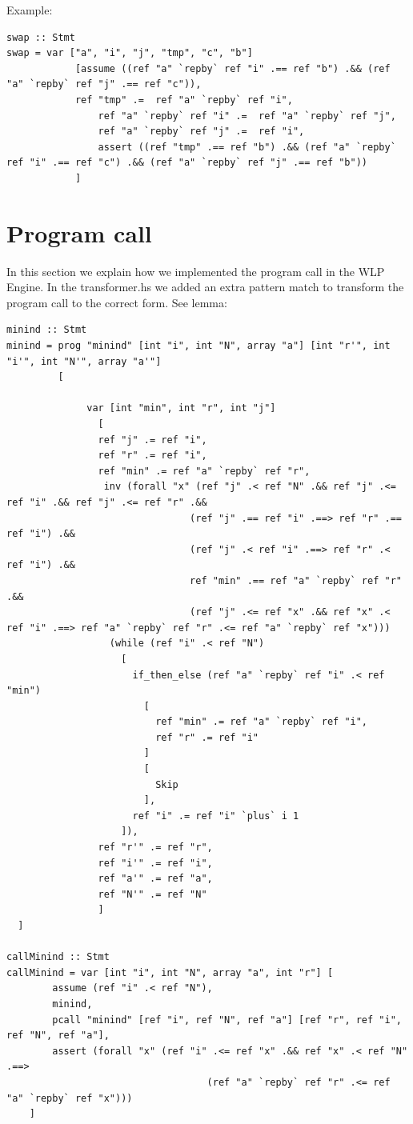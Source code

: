 \documentclass{article}
\begin{document}
Example:
\begin{lstlisting}
swap :: Stmt
swap = var ["a", "i", "j", "tmp", "c", "b"] 
            [assume ((ref "a" `repby` ref "i" .== ref "b") .&& (ref "a" `repby` ref "j" .== ref "c")), 
            ref "tmp" .=  ref "a" `repby` ref "i",
                ref "a" `repby` ref "i" .=  ref "a" `repby` ref "j",
                ref "a" `repby` ref "j" .=  ref "i",
                assert ((ref "tmp" .== ref "b") .&& (ref "a" `repby` ref "i" .== ref "c") .&& (ref "a" `repby` ref "j" .== ref "b"))
            ]
\end{lstlisting}



\section{Program call}
In this section we explain how we implemented the program call in the WLP Engine. In the transformer.hs we added an extra pattern match to transform the program call to the correct form. See lemma:

\begin{lstlisting}
minind :: Stmt
minind = prog "minind" [int "i", int "N", array "a"] [int "r'", int "i'", int "N'", array "a'"]
         [

              var [int "min", int "r", int "j"]
                [
                ref "j" .= ref "i",
                ref "r" .= ref "i",
                ref "min" .= ref "a" `repby` ref "r",
                 inv (forall "x" (ref "j" .< ref "N" .&& ref "j" .<= ref "i" .&& ref "j" .<= ref "r" .&&
                                (ref "j" .== ref "i" .==> ref "r" .== ref "i") .&&
                                (ref "j" .< ref "i" .==> ref "r" .< ref "i") .&&
                                ref "min" .== ref "a" `repby` ref "r" .&&
                                (ref "j" .<= ref "x" .&& ref "x" .< ref "i" .==> ref "a" `repby` ref "r" .<= ref "a" `repby` ref "x")))
                  (while (ref "i" .< ref "N")
                    [
                      if_then_else (ref "a" `repby` ref "i" .< ref "min")
                        [
                          ref "min" .= ref "a" `repby` ref "i",
                          ref "r" .= ref "i"
                        ]
                        [
                          Skip
                        ],
                      ref "i" .= ref "i" `plus` i 1
                    ]),
                ref "r'" .= ref "r",
                ref "i'" .= ref "i",
                ref "a'" .= ref "a",
                ref "N'" .= ref "N"
                ]
  ]

callMinind :: Stmt
callMinind = var [int "i", int "N", array "a", int "r"] [
        assume (ref "i" .< ref "N"),
        minind,
        pcall "minind" [ref "i", ref "N", ref "a"] [ref "r", ref "i", ref "N", ref "a"],
        assert (forall "x" (ref "i" .<= ref "x" .&& ref "x" .< ref "N" .==> 
                                   (ref "a" `repby` ref "r" .<= ref "a" `repby` ref "x")))
    ] 
\end{lstlisting}
\end{document}
